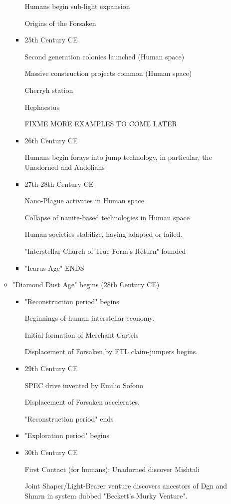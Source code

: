 \begin{itemize}
\begin{itemize}
\begin{itemize}
Humans begin sub-light expansion 

Origins of the Forsaken 

\item	25th Century CE 

Second generation colonies launched (Human space) 

Massive construction projects common (Human space) 

Cherryh station 

Hephaestus 

FIXME MORE EXAMPLES TO COME LATER 
\item	26th Century CE 

Humans begin forays into jump technology, in particular, the Unadorned
and Andolians

\item	27th-28th Century CE 

Nano-Plague activates in Human space 

Collapse of nanite-based technologies in Human space 

Human societies stabilize, having adapted or failed. 

"Interstellar Church of True Form's Return" founded 

\item "Icarus Age" ENDS 
\end{itemize}
\item "Diamond Dust Age" begins (28th Century CE) 
\begin{itemize}
\item	"Reconstruction period" begins 

Beginnings of human interstellar economy. 

Initial formation of Merchant Cartels 

Displacement of Forsaken by FTL claim-jumpers begins. 

\item	29th Century CE 

SPEC drive invented by Emilio Sofono 

Displacement of Forsaken accelerates. 

"Reconstruction period" ends 

\item	"Exploration period" begins 
\item	30th Century CE 

First Contact (for humans): Unadorned discover Mishtali 

Joint Shaper/Light-Bearer venture discovers ancestors of Dgn and Shmrn
in system dubbed "Beckett's Murky Venture".


\end{itemize}
\end{itemize}
\end{itemize}
